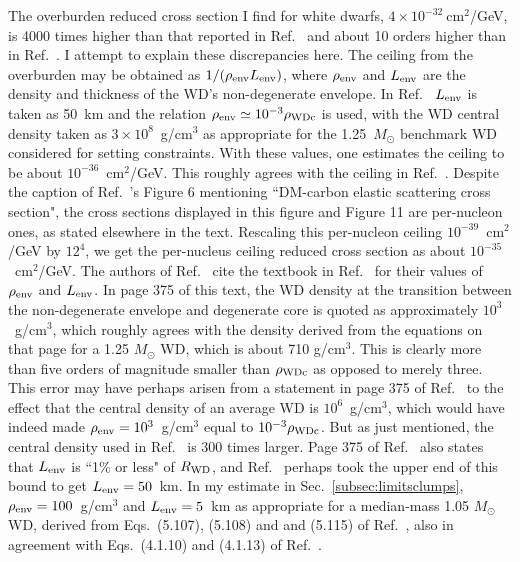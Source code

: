 \documentclass[
    twocolumn,
	prd,
        amssymb,
	preprintnumbers,
	secnumarabic,
	nofootinbib,
	superscriptaddress]{revtex4-1}
\begin{document}
The overburden reduced cross section I find for white dwarfs, $4 \times 10^{-32}~$cm$^2$/GeV, is 4000 times higher than that reported in Ref.~\cite{Graham:2018efk} and about 10 orders higher than in Ref.~\cite{MACROSidhu2020}.
I attempt to explain these discrepancies here.
The ceiling from the overburden may be obtained as $1/(\rho_{\rm env} L_{\rm env})$, where $\rho_{\rm env}$ and $L_{\rm env}$ are the density and thickness of the WD's non-degenerate envelope.
In Ref.~\cite{Graham:2018efk} $L_{\rm env}$ is taken as 50~km and the relation $\rho_{\rm env} \simeq 10^{-3} \rho_{\rm WDc}$ is used, with the WD central density taken as $3\times 10^8$~g/cm$^3$ as appropriate for the 1.25~$M_\odot$ benchmark WD considered for setting constraints.
With these values, one estimates the ceiling to be about $10^{-36}$~cm$^2$/GeV.
This roughly agrees with the ceiling in Ref.~\cite{Graham:2018efk}.
Despite the caption of Ref.~\cite{Graham:2018efk}'s Figure 6 mentioning  ``DM-carbon elastic scattering cross section", the cross sections displayed in this figure and Figure 11 are per-nucleon ones, as stated elsewhere in the text.
Rescaling this per-nucleon ceiling $10^{-39}$~cm$^2$/GeV by $12^4$, we get the per-nucleus ceiling reduced cross section as about $10^{-35}$~cm$^2$/GeV.
The authors of Ref.~\cite{Graham:2018efk} cite the textbook in Ref.~\cite{text:kippenhahnweigert} for their values of $\rho_{\rm env}$ and $L_{\rm env}$.
In page 375 of this text, the WD density at the transition between the non-degenerate envelope and degenerate core is quoted as approximately $10^3$~g/cm$^3$, which roughly agrees with the density derived from the equations on that page for a 1.25 $M_\odot$ WD, which is about 710 g/cm$^3$.
This is clearly more than five orders of magnitude smaller than $\rho_{\rm WDc}$ as opposed to merely three.
This error may have perhaps arisen from a statement in page 375 of Ref.~\cite{text:kippenhahnweigert} to the effect that the central density of an average WD is $10^6$~g/cm$^3$, which would have indeed made $\rho_{\rm env} = 10^3$~g/cm$^3$ equal to $10^{-3} \rho_{\rm WDc}$.
But as just mentioned, the central density used in Ref.~\cite{Graham:2018efk} is 300 times larger.
Page 375 of Ref.~\cite{text:kippenhahnweigert} also states that $L_{\rm env}$ is ``1\% or less" of $R_{\rm WD}$, and Ref.~\cite{Graham:2018efk} perhaps took the upper end of this bound to get $L_{\rm env} = 50$~km.
In my estimate in Sec.~\ref{subsec:limitsclumps}, $\rho_{\rm env} = 100$~g/cm$^3$ and $L_{\rm env} = 5$~km as appropriate for a median-mass 1.05 $M_\odot$ WD, derived from Eqs.~(5.107), (5.108) and and (5.115) of Ref.~\cite{text:paddytheoryastroII}, also in agreement with Eqs.~(4.1.10) and (4.1.13) of Ref.~\cite{text:ShapiroTeukolsky}.
\end{document}
